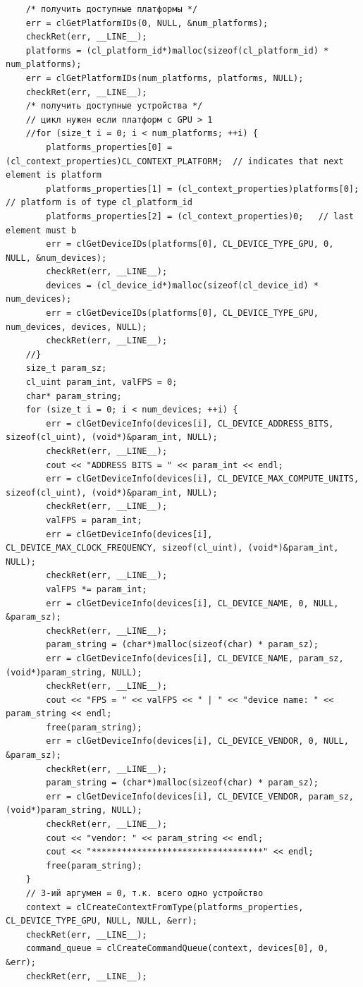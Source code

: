\documentclass[utf8, 12pt, a4paper, oneside]{article}
\begin{document}
\begin{lstlisting}
    /* получить доступные платформы */
    err = clGetPlatformIDs(0, NULL, &num_platforms);
    checkRet(err, __LINE__);
    platforms = (cl_platform_id*)malloc(sizeof(cl_platform_id) * num_platforms);
    err = clGetPlatformIDs(num_platforms, platforms, NULL);
    checkRet(err, __LINE__);
    /* получить доступные устройства */
    // цикл нужен если платформ с GPU > 1
    //for (size_t i = 0; i < num_platforms; ++i) {
        platforms_properties[0] = (cl_context_properties)CL_CONTEXT_PLATFORM;  // indicates that next element is platform
        platforms_properties[1] = (cl_context_properties)platforms[0];  // platform is of type cl_platform_id
        platforms_properties[2] = (cl_context_properties)0;   // last element must b
        err = clGetDeviceIDs(platforms[0], CL_DEVICE_TYPE_GPU, 0, NULL, &num_devices);
        checkRet(err, __LINE__);
        devices = (cl_device_id*)malloc(sizeof(cl_device_id) * num_devices);
        err = clGetDeviceIDs(platforms[0], CL_DEVICE_TYPE_GPU, num_devices, devices, NULL);
        checkRet(err, __LINE__);
    //}
    size_t param_sz;
    cl_uint param_int, valFPS = 0;
    char* param_string;
    for (size_t i = 0; i < num_devices; ++i) {        
        err = clGetDeviceInfo(devices[i], CL_DEVICE_ADDRESS_BITS, sizeof(cl_uint), (void*)&param_int, NULL);
        checkRet(err, __LINE__);        
        cout << "ADDRESS BITS = " << param_int << endl;
        err = clGetDeviceInfo(devices[i], CL_DEVICE_MAX_COMPUTE_UNITS, sizeof(cl_uint), (void*)&param_int, NULL);
        checkRet(err, __LINE__);        
        valFPS = param_int;
        err = clGetDeviceInfo(devices[i], CL_DEVICE_MAX_CLOCK_FREQUENCY, sizeof(cl_uint), (void*)&param_int, NULL);
        checkRet(err, __LINE__);        
        valFPS *= param_int;
        err = clGetDeviceInfo(devices[i], CL_DEVICE_NAME, 0, NULL, &param_sz);
        checkRet(err, __LINE__);        
        param_string = (char*)malloc(sizeof(char) * param_sz);
        err = clGetDeviceInfo(devices[i], CL_DEVICE_NAME, param_sz, (void*)param_string, NULL);
        checkRet(err, __LINE__);
        cout << "FPS = " << valFPS << " | " << "device name: " << param_string << endl;
        free(param_string);
        err = clGetDeviceInfo(devices[i], CL_DEVICE_VENDOR, 0, NULL, &param_sz);
        checkRet(err, __LINE__);        
        param_string = (char*)malloc(sizeof(char) * param_sz);
        err = clGetDeviceInfo(devices[i], CL_DEVICE_VENDOR, param_sz, (void*)param_string, NULL);
        checkRet(err, __LINE__);
        cout << "vendor: " << param_string << endl;
        cout << "**********************************" << endl;
        free(param_string);
    }
    // 3-ий аргумен = 0, т.к. всего одно устройство
    context = clCreateContextFromType(platforms_properties, CL_DEVICE_TYPE_GPU, NULL, NULL, &err);    
    checkRet(err, __LINE__);
    command_queue = clCreateCommandQueue(context, devices[0], 0, &err);
    checkRet(err, __LINE__);


\end{lstlisting}
\end{document}

